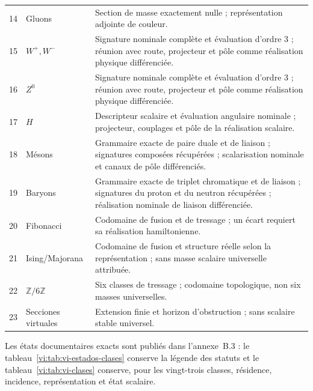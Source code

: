 \begin{longtable}{@{}p{.11\linewidth}p{.20\linewidth}p{.62\linewidth}@{}}
 14&Gluons&Section de masse exactement nulle ; représentation adjointe de couleur.\\
 15&\(W^+,W^-\)&Signature nominale complète et évaluation d’ordre \(3\) ; réunion avec route, projecteur et pôle comme réalisation physique différenciée.\\
 16&\(Z^0\)&Signature nominale complète et évaluation d’ordre \(3\) ; réunion avec route, projecteur et pôle comme réalisation physique différenciée.\\
 17&\(H\)&Descripteur scalaire et évaluation angulaire nominale ; projecteur, couplages et pôle de la réalisation scalaire.\\
 18&Mésons&Grammaire exacte de paire duale et de liaison ; signatures composées récupérées ; scalarisation nominale et canaux de pôle différenciés.\\
 19&Baryons&Grammaire exacte de triplet chromatique et de liaison ; signatures du proton et du neutron récupérées ; réalisation nominale de liaison différenciée.\\
 20&Fibonacci
&Codomaine de fusion et de tressage ; un écart requiert sa réalisation hamiltonienne.\\
 21&Ising/Majorana&Codomaine de fusion et structure réelle selon la représentation ; sans masse scalaire universelle attribuée.\\
 22&\(\mathbb Z/6\mathbb Z\)&Six classes de tressage ; codomaine topologique, non six masses universelles.\\
 23&Secciones virtuales&Extension finie et horizon d’obstruction ; sans scalaire stable universel.\\
\end{longtable}

Les états documentaires exacts sont publiés dans l'annexe~B.3 : le
tableau~\ref{vi:tab:vi-estados-clases} conserve la légende des statuts et le
tableau~\ref{vi:tab:vi-clases} conserve, pour les vingt-trois classes, résidence,
incidence, représentation et état scalaire.

